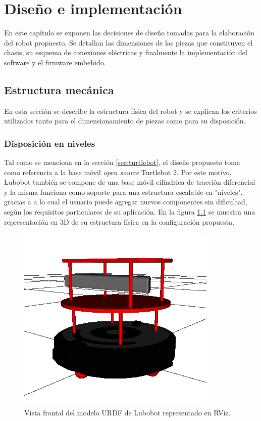 \chapter{Diseño e implementación}

\label{Capitulo3}

En este capítulo se exponen las decisiones de diseño tomadas para la elaboración del robot propuesto. Se detallan las dimensiones de las piezas que constituyen el chasis, su esquema de conexiones eléctricas y finalmente la implementación del software y el firmware embebido.

\section{Estructura mecánica}

En esta sección se describe la estructura física del robot y se explican los criterios utilizados tanto para el dimensionamiento de piezas como para su disposición.

\subsection{Disposición en niveles}
Tal como se menciona en la sección \ref{sec:turtlebot}, el diseño propuesto toma como referencia a la base móvil \textit{open source} Turtlebot 2. Por este motivo, Lubobot también se compone de una base móvil cilindrica de tracción diferencial y la misma funciona como soporte para una estructura escalable en "niveles", gracias a a lo cual el usuario puede agregar nuevos componentes sin dificultad, según los requisitos particulares de su aplicación. En la figura \ref{fig:lubobotURDF} se muestra una representación en 3D de su estructura física en la configuración propuesta.

\begin{figure}[ht]
    \centering
    \includegraphics[scale=0.5]{./Figures/lubobot_urdf.png}
    \caption{Vista frontal del modelo URDF de Lubobot representado en RViz.}
    \label{fig:lubobotURDF}
\end{figure}

